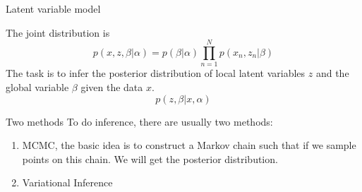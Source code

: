 \begin{frame}{Latent variable model}

The joint distribution is 
$$p(x,z,\beta | \alpha)=p(\beta | \alpha)\prod_{n=1}^N p(x_n,z_n | \beta)$$
The task is to infer the posterior distribution of local latent variables $z$ and the global variable $\beta$ given the data $x$. 
$$p(z, \beta | x, \alpha)$$
\end{frame}

\begin{frame}{Two methods}
To do inference, there are usually two methods:
\begin{enumerate}
\item MCMC, the basic idea is to construct a Markov chain such that if we sample points on this chain. We will get the posterior distribution.
\item Variational Inference
\end{enumerate}


\end{frame}